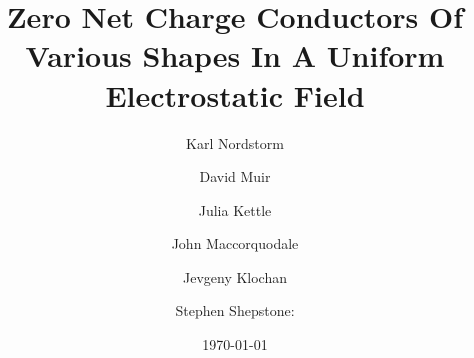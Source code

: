 \documentclass[aps,twocolumn,pre,nofootinbib]{revtex4-1}
\begin{document}

\newcommand{\breite}{1.0} %


\newtheorem{prop}{Proposition}
\newtheorem{cor}{Corollary}

\newcommand{\be}{\begin{equation}}
\newcommand{\ee}{\end{equation}}

\newcommand{\bea}{\begin{eqnarray}}
\newcommand{\eea}{\end{eqnarray}}

\newcommand{\Reals}{\mathbb{R}}     %
\newcommand{\Int}{\mathbb{Z}}       %
\newcommand{\Com}{\mathbb{C}}       %
\newcommand{\Nat}{\mathbb{N}}       %


\newcommand{\id}{\mathbbm{1}}    

\newcommand{\Real}{\mathop{\mathrm{Re}}}
\newcommand{\Imag}{\mathop{\mathrm{Im}}}

\def\O{\mbox{$\mathcal{O}$}}    
\def\F{\mathcal{F}}			
\def\sgn{\text{sgn}}

\newcommand{\dw}{\ensuremath{\Delta}} %
\newcommand{\wbp}{\ensuremath{\omega_0}}
\newcommand{\dv}{\ensuremath{\delta}}
\newcommand{\vbp}{\ensuremath{\nu_0}}
\newcommand{\vplus}{\ensuremath{\nu_{+}}}
\newcommand{\vminus}{\ensuremath{\nu_{-}}}
\newcommand{\wplus}{\ensuremath{\omega_{+}}}
\newcommand{\wminus}{\ensuremath{\omega_{-}}}



\title{Zero Net Charge Conductors Of Various Shapes In A Uniform Electrostatic Field}


\author{Karl Nordstorm}

\author{David Muir}

\author{Julia Kettle}

\author{John Maccorquodale}

\author{Jevgeny Klochan}

\author{Stephen Shepstone: }



\date{\today}
\end{document}
